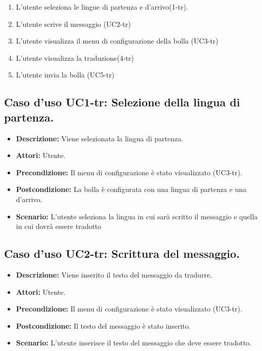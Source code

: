 \begin{itemize}
\begin{enumerate}
\item L'utente seleziona le lingue di partenza e d'arrivo(1-tr). 

\item L'utente scrive il messaggio (UC2-tr)

\item L'utente visualizza il menu di configurazione della bolla (UC3-tr)

\item L'utente visualizza la traduzione(4-tr)

\item L'utente invia la bolla (UC5-tr)
\end{enumerate} 
\end{itemize}

\subsection{Caso d'uso UC1-tr: Selezione della lingua di partenza.}
\begin{itemize}
\item[]\textbf{Descrizione:} Viene selezionata la lingua di partenza.
\item[]\textbf{Attori:} Utente. 
\item[]\textbf{Precondizione:} Il menu di configurazione è stato visualizzato (UC3-tr). 
\item[]\textbf{Postcondizione:} La bolla è configurata con una lingua di partenza e una d'arrivo. 
\item[]\textbf{Scenario:}
L'utente seleziona la lingua in cui sarà scritto il messaggio e quella in cui dovrà essere tradotto 
\end{itemize}

\subsection{Caso d'uso UC2-tr: Scrittura del messaggio.}
\begin{itemize}
\item[]\textbf{Descrizione:} Viene inserito il testo del messaggio da tradurre.
\item[]\textbf{Attori:} Utente. 
\item[]\textbf{Precondizione:} Il menu di configurazione è stato visualizzato (UC3-tr). 
\item[]\textbf{Postcondizione:} Il testo del messaggio è stato inserito. 
\item[]\textbf{Scenario:}
L'utente inserisce il testo del messaggio che deve essere tradotto. 
\end{itemize}

